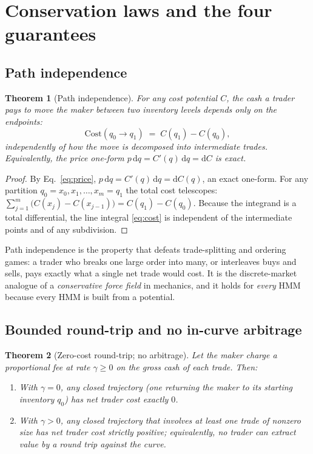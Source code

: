\documentclass[11pt]{article}
\newtheorem{theorem}{Theorem}
\newcommand{\dd}{\mathrm{d}}
\begin{document}
\section{Conservation laws and the four guarantees}
\label{sec:hmm-conservation}

\subsection{Path independence}

\begin{theorem}[Path independence]
\label{thm:path}
For any cost potential $C$, the cash a trader pays to move the maker between two
inventory levels depends only on the endpoints:
\begin{equation}
\mathrm{Cost}(q_0\!\to q_1) \;=\; C(q_1) - C(q_0),
\end{equation}
independently of how the move is decomposed into intermediate trades. Equivalently,
the price one-form $p\,\dd q = C'(q)\,\dd q = \dd C$ is exact.
\end{theorem}

\begin{proof}
By Eq.~\eqref{eq:price}, $p\,\dd q = C'(q)\,\dd q = \dd C(q)$, an exact one-form.
For any partition $q_0 = x_0, x_1, \dots, x_m = q_1$ the total cost telescopes:
$\sum_{j=1}^m \big(C(x_j)-C(x_{j-1})\big) = C(q_1)-C(q_0)$. Because the integrand
is a total differential, the line integral \eqref{eq:cost} is independent of the
intermediate points and of any subdivision.
\end{proof}

Path independence is the property that defeats trade-splitting and ordering games:
a trader who breaks one large order into many, or interleaves buys and sells, pays
exactly what a single net trade would cost. It is the discrete-market analogue of a
\emph{conservative force field} in mechanics, and it holds for \emph{every} HMM
because every HMM is built from a potential.

\subsection{Bounded round-trip and no in-curve arbitrage}

\begin{theorem}[Zero-cost round-trip; no arbitrage]
\label{thm:roundtrip}
Let the maker charge a proportional fee at rate $\gamma\ge 0$ on the gross cash of
each trade. Then:
\begin{enumerate}[leftmargin=1.6em,label=(\alph*)]
  \item With $\gamma=0$, any closed trajectory (one returning the maker to its
        starting inventory $q_0$) has net trader cost exactly $0$.
  \item With $\gamma>0$, any closed trajectory that involves at least one trade of
        nonzero size has net trader cost strictly positive; equivalently, no trader
        can extract value by a round trip against the curve.
\end{enumerate}
\end{theorem}
\end{document}
